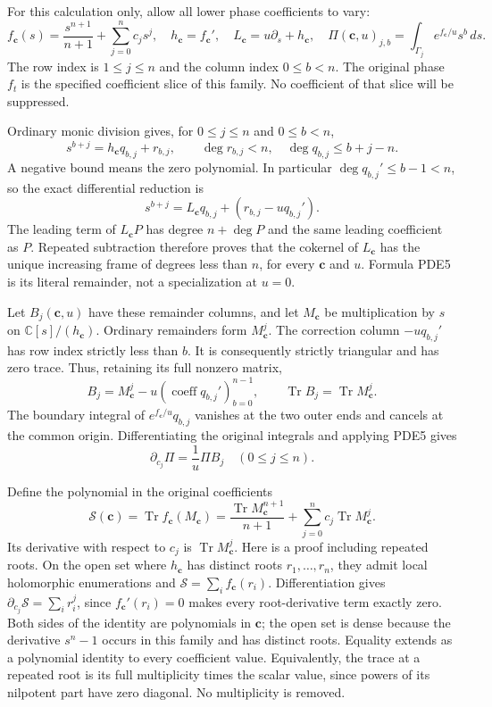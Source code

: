 \documentclass[11pt,a4paper]{article}
\begin{document}
For this calculation only, allow all lower phase coefficients to vary:
\[
 f_{\mathbf c}(s)=\frac{s^{n+1}}{n+1}+\sum_{j=0}^n c_js^j,
 \quad h_{\mathbf c}=f_{\mathbf c}',\quad
 L_{\mathbf c}=u\partial_s+h_{\mathbf c},\quad
 \Pi(\mathbf c,u)_{j,b}
       =\int_{\Gamma_j}e^{f_{\mathbf c}/u}s^b\,ds.
 \tag{PDE3}
\]
The row index is $1\leq j\leq n$ and the column index $0\leq b<n$.
The original phase $f_t$ is the specified coefficient slice of this
family. No coefficient of that slice will be suppressed.

Ordinary monic division gives, for $0\leq j\leq n$ and $0\leq b<n$,
\[
 s^{b+j}=h_{\mathbf c}q_{b,j}+r_{b,j},\qquad
 \deg r_{b,j}<n,\quad\deg q_{b,j}\leq b+j-n.
 \tag{PDE4}
\]
A negative bound means the zero polynomial. In particular
$\deg q_{b,j}'\leq b-1<n$, so the exact differential reduction is
\[
 s^{b+j}=L_{\mathbf c}q_{b,j}
                    +(r_{b,j}-u q_{b,j}').
 \tag{PDE5}
\]
The leading term of $L_{\mathbf c}P$ has degree $n+\deg P$ and the same
leading coefficient as $P$. Repeated subtraction therefore proves that
the cokernel of $L_{\mathbf c}$ has the unique increasing frame of
degrees less than $n$, for every $\mathbf c$ and $u$. Formula PDE5 is
its literal remainder, not a specialization at $u=0$.

Let $B_j(\mathbf c,u)$ have these remainder columns, and let
$M_{\mathbf c}$ be multiplication by $s$ on
$\mathbb{C}[s]/(h_{\mathbf c})$. Ordinary remainders form
$M_{\mathbf c}^j$. The correction column $-u q_{b,j}'$ has row index
strictly less than $b$. It is consequently strictly triangular and has
zero trace. Thus, retaining its full nonzero matrix,
\[
 B_j=M_{\mathbf c}^{j}-u(\operatorname{coeff}q_{b,j}')_{b=0}^{n-1},
 \qquad \operatorname{Tr}B_j=\operatorname{Tr}M_{\mathbf c}^{j}.
 \tag{PDE6}
\]
The boundary integral of $e^{f_{\mathbf c}/u}q_{b,j}$ vanishes at
the two outer ends and cancels at the common origin. Differentiating
the original integrals and applying PDE5 gives
\[
 \partial_{c_j}\Pi=\frac1u\Pi B_j\quad(0\leq j\leq n).
 \tag{PDE7}
\]

Define the polynomial in the original coefficients
\[
 \mathcal S(\mathbf c)
  =\operatorname{Tr} f_{\mathbf c}(M_{\mathbf c})
  =\frac{\operatorname{Tr}M_{\mathbf c}^{n+1}}{n+1}
                +\sum_{j=0}^n c_j\operatorname{Tr}M_{\mathbf c}^j.
 \tag{PDE8}
\]
Its derivative with respect to $c_j$ is
$\operatorname{Tr}M_{\mathbf c}^j$. Here is a proof including repeated
roots. On the open set where $h_{\mathbf c}$ has distinct roots
$r_1,\ldots,r_n$, they admit local holomorphic enumerations and
$\mathcal S=\sum_i f_{\mathbf c}(r_i)$. Differentiation gives
$\partial_{c_j}\mathcal S=\sum_i r_i^j$, since
$f_{\mathbf c}'(r_i)=0$ makes every root-derivative term exactly zero.
Both sides of the identity are polynomials in $\mathbf c$; the open
set is dense because the derivative $s^n-1$ occurs in this family
and has distinct roots. Equality extends as a polynomial identity to
every coefficient value. Equivalently, the trace at a repeated root
is its full multiplicity times the scalar value, since powers of its
nilpotent part have zero diagonal. No multiplicity is removed.
\end{document}
